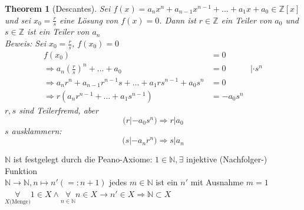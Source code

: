 \documentclass{article}
\newtheorem{thm}{Theorem}[section]
\newcommand{\N}{\mathbb{N}}
\newcommand{\Z}{\mathbb{Z}}
\begin{document}
\begin{thm}[Descantes]
    Sei $f(x)=a_nx^n+a_{n-1}x^{n-1}+\hdots+a_1x+a_0\in\Z[x]$\\
    und sei $x_0=\frac{r}{s}$ eine Lösung von $f(x)=0$.
    Dann ist $r\in\Z$ ein Teiler von $a_0$ und $s\in\Z$
    ist ein Teiler von $a_n$\\
    Beweis: Sei $x_0=\frac{r}{s}$, $f(x_0)=0$
    \begin{align*}
        f(x_0)&=0\\
        \Rightarrow
        a_n\left(\frac{r}{s}\right)^n+\hdots+a_0&=0&|\cdot s^n\\
        \Rightarrow
        a_nr^n+a_{n-1}r^{n-1}s+\hdots+a_1rs^{n-1}+a_0s^n&=0\\
        \Rightarrow
        r(a_nr^{n-1}+\hdots+a_1s^{n-1})&=-a_0s^n
    \end{align*}
    $r,s$ sind Teilerfremd, aber
    \begin{equation*}
        (r|-a_0s^n)\Rightarrow r|a_0
    \end{equation*}
    $s$ ausklammern:
    \begin{equation*}
        (s|-a_nr^n)\Rightarrow s|a_n
    \end{equation*}
\end{thm}
\color{blue}
$\N$ ist festgelegt durch die Peano-Axiome:
$1\in\N,\exists$ injektive (Nachfolger-) Funktion\\
$\N\rightarrow\N,n\mapsto n'(=:n+1)$ jedes $m\in\N$ ist
ein $n'$ mit Ausnahme $m=1$\\

$\underset{X\text{(Menge)}}\forall 1\in X\land
\underset{n\in\N}\forall n\in X\rightarrow n'\in X
\Rightarrow \N\subset X$
\end{document}
